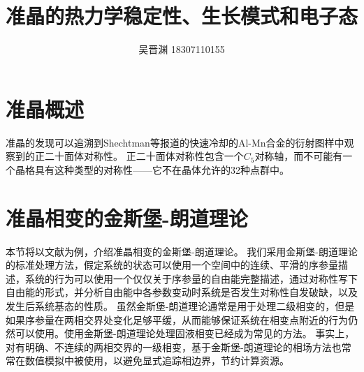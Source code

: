 \documentclass[hyperref, UTF8, a4paper]{ctexart}
\title{准晶的热力学稳定性、生长模式和电子态}
\author{吴晋渊 18307110155}
\date{}
\begin{document}
\maketitle

\section{准晶概述}

准晶的发现可以追溯到Shechtman等报道的快速冷却的Al-Mn合金的衍射图样中观察到的正二十面体对称性\cite{PhysRevLett.53.1951}。
正二十面体对称性包含一个$C_5$对称轴，而不可能有一个晶格具有这种类型的对称性——它不在晶体允许的32种点群中\cite{Johnston_1960}。


\section{准晶相变的金斯堡-朗道理论}

本节将以文献\cite{PhysRevB.32.5764}为例，介绍准晶相变的金斯堡-朗道理论。
我们采用金斯堡-朗道理论的标准处理方法，假定系统的状态可以使用一个空间中的连续、平滑的序参量描述，系统的行为可以使用一个仅仅关于序参量的自由能完整描述，通过对称性写下自由能的形式，并分析自由能中各参数变动时系统是否发生对称性自发破缺，以及发生后系统基态的性质。
虽然金斯堡-朗道理论通常是用于处理二级相变的，但是如果序参量在两相交界处变化足够平缓，从而能够保证系统在相变点附近的行为仍然可以使用。使用金斯堡-朗道理论处理固液相变已经成为常见的方法\cite{fabrizio2008,PhysRevB.90.104101}。
事实上，对有明确、不连续的两相交界的一级相变，基于金斯堡-朗道理论的相场方法\cite{provatas2011phase}也常常在数值模拟中被使用，以避免显式追踪相边界，节约计算资源\cite{boettinger2002phase}。
\end{document}
